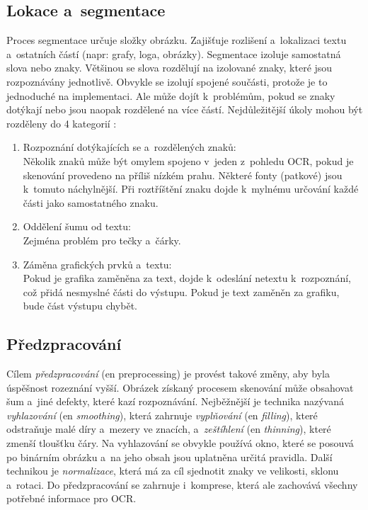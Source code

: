 \documentclass[12pt,oneside]{report}			%
\begin{document}
	\subsection{Lokace a~segmentace}
	\label{sec:locate-segment}
	Proces segmentace určuje složky obrázku. Zajišťuje rozlišení a~lokalizaci textu a~ostatních částí (\gls{napr}: grafy, loga, obrázky). Segmentace izoluje samostatná slova nebo znaky. Většinou se slova rozdělují na izolované znaky, které jsou rozpoznávány jednotlivě. Obvykle se izolují spojené součásti, protože je to jednoduché na implementaci. Ale může dojít k~problémům, pokud se znaky dotýkají nebo jsou naopak rozdělené na více částí. \parencite[\gls{str} 17]{chaudhuri2017optical}
	Nejdůležitější úkoly mohou být rozděleny do 4 kategorií \parencite[\gls{s} 13]{eikvil-ocr}:
	\begin{enumerate}
	\item{Rozpoznání dotýkajících se a~rozdělených znaků:\\ Několik znaků může být omylem spojeno v~jeden z~pohledu \gls{OCR}, pokud je skenování provedeno na příliš nízkém prahu. Některé fonty (patkové) jsou k~tomuto náchylnější. Při roztříštění znaku dojde k~mylnému určování každé části jako samostatného znaku.}
	\item{Oddělení šumu od textu:\\ Zejména problém pro tečky a~čárky.}
	\item{Záměna grafických prvků a~textu:\\ Pokud je grafika zaměněna za text, dojde k~odeslání netextu k~rozpoznání, což přidá nesmyslné části do výstupu. Pokud je text zaměněn za grafiku, bude část výstupu chybět.}
	\end{enumerate}
	
	\subsection{Předzpracování}
	\label{sec:Preproces}
	Cílem \emph{předzpracování} (\gls{en} preprocessing) je provést takové změny, aby byla úspěšnost rozeznání vyšší. Obrázek získaný procesem skenování může obsahovat šum a~jiné defekty, které kazí rozpoznávání. Nejběžnější je technika nazývaná \emph{vyhlazování} (\gls{en} \emph{smoothing}), která zahrnuje \emph{vyplňování} (\gls{en} \emph{filling}), které odstraňuje malé díry a~mezery ve znacích, a~\emph{zeštíhlení} (\gls{en} \emph{thinning}), které zmenší tloušťku čáry. Na vyhlazování se obvykle používá okno, které se posouvá po binárním obrázku a~na jeho obsah jsou uplatněna určitá pravidla. Další technikou je \emph{normalizace}, která má za cíl sjednotit znaky ve velikosti, sklonu a~rotaci. Do předzpracování se zahrnuje i~komprese, která ale zachovává všechny potřebné informace pro OCR. \parencite[\gls{s} 17-18]{chaudhuri2017optical}			
	
\end{document}
